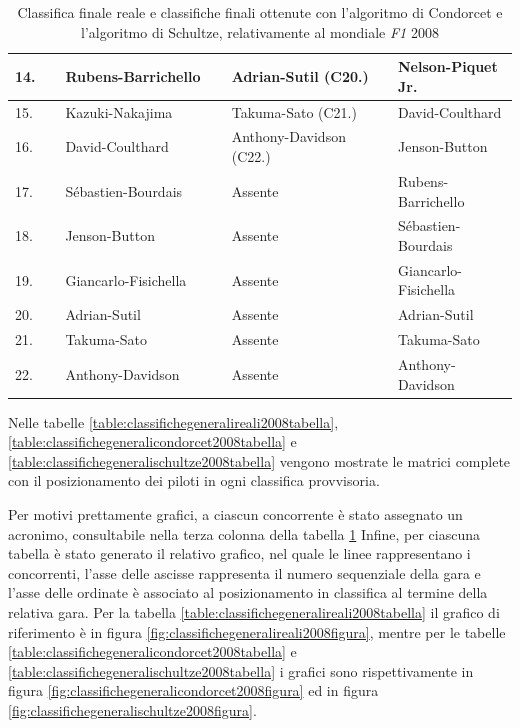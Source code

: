 \documentclass[12pt,a4paper,openright,twoside]{book}
\begin{document}
\begin{table}[H]
{\begin{tabular}{|p{0.1\linewidth}|p{0.33\linewidth}|p{0.33\linewidth}|p{0.33\linewidth}|}
    14.	&Rubens-Barrichello & 	 Adrian-Sutil (C20.)& 	 Nelson-Piquet Jr. 	 \\ \hline
    15.&	Kazuki-Nakajima & 	 Takuma-Sato (C21.) & 	 David-Coulthard 	 \\ \hline
    16.&	David-Coulthard & 	 Anthony-Davidson (C22.)& 	 Jenson-Button 	 \\ \hline
    17.&	Sébastien-Bourdais & 	 Assente & 	 Rubens-Barrichello 	 \\ \hline
    18.&	Jenson-Button & 	 Assente & 	 Sébastien-Bourdais 	 \\ \hline
    19.&	Giancarlo-Fisichella & 	 Assente & 	 Giancarlo-Fisichella 	 \\ \hline
    20.&	Adrian-Sutil & 	 Assente & 	 Adrian-Sutil 	 \\ \hline
    21.&	Takuma-Sato & 	 Assente & 	 Takuma-Sato 	 \\ \hline
    22.&	Anthony-Davidson & 	 Assente & 	 Anthony-Davidson 	 \\ \hline
    
    \end{tabular}}
    \endgroup

    \caption{Classifica finale reale e classifiche finali ottenute con 
    l'algoritmo di Condorcet e l'algoritmo di Schultze, relativamente al mondiale \textit{F1} 2008 }
    \label{table:classifichefinali2008}
\end{table}


Nelle tabelle \ref{table:classifichegeneralireali2008tabella}, \ref{table:classifichegeneralicondorcet2008tabella} e \ref{table:classifichegeneralischultze2008tabella}
vengono mostrate le matrici complete con il posizionamento dei piloti in ogni classifica provvisoria.

Per motivi prettamente grafici, a ciascun concorrente è stato assegnato un acronimo, consultabile nella terza colonna della tabella \ref{table:classifichefinali2008}
Infine, per ciascuna tabella è stato generato il relativo grafico, nel quale le linee rappresentano i concorrenti,
l'asse delle ascisse rappresenta il numero sequenziale della gara e l'asse delle ordinate è associato al posizionamento in classifica
al termine della relativa gara.
Per la tabella \ref{table:classifichegeneralireali2008tabella} il grafico di riferimento è in figura \ref{fig:classifichegeneralireali2008figura},
mentre per le tabelle \ref{table:classifichegeneralicondorcet2008tabella} e \ref{table:classifichegeneralischultze2008tabella} i grafici sono rispettivamente
in figura \ref{fig:classifichegeneralicondorcet2008figura} ed in figura \ref{fig:classifichegeneralischultze2008figura}.
\end{document}
